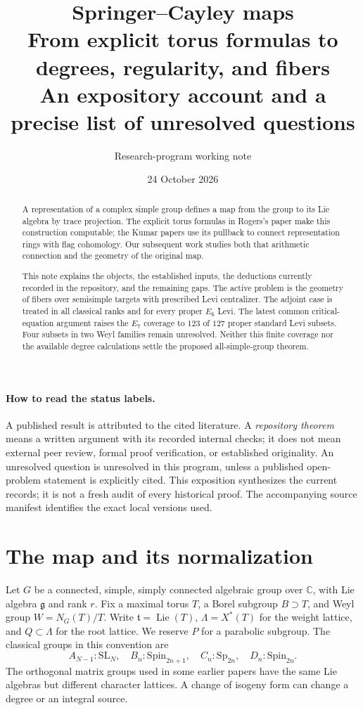 \documentclass[11pt]{article}
\title{\textbf{Springer--Cayley maps}\\[4pt]\large From explicit torus formulas to degrees, regularity, and fibers\\[4pt]\normalsize An expository account and a precise list of unresolved questions}
\author{Research-program working note}
\date{24 October 2026}
\newcommand{\C}{\mathbb C}
\newcommand{\g}{\mathfrak g}
\newcommand{\h}{\mathfrak t}
\newcommand{\Lie}{\operatorname{Lie}}
\begin{document}
\maketitle
\begin{abstract}
A representation of a complex simple group defines a map from the group to its Lie algebra by trace projection. The explicit torus formulas in Rogers's paper make this construction computable; the Kumar papers use its pullback to connect representation rings with flag cohomology. Our subsequent work studies both that arithmetic connection and the geometry of the original map.

This note explains the objects, the established inputs, the deductions currently recorded in the repository, and the remaining gaps. The active problem is the geometry of fibers over semisimple targets with prescribed Levi centralizer. The adjoint case is treated in all classical ranks and for every proper $E_6$ Levi. The latest common critical-equation argument raises the $E_7$ coverage to $123$ of $127$ proper standard Levi subsets. Four subsets in two Weyl families remain unresolved. Neither this finite coverage nor the available degree calculations settle the proposed all-simple-group theorem.
\end{abstract}

\paragraph{How to read the status labels.}
A published result is attributed to the cited literature. A \emph{repository theorem} means a written argument with its recorded internal checks; it does not mean external peer review, formal proof verification, or established originality. An unresolved question is unresolved in this program, unless a published open-problem statement is explicitly cited. This exposition synthesizes the current records; it is not a fresh audit of every historical proof. The accompanying source manifest identifies the exact local versions used.

\section{The map and its normalization}

Let $G$ be a connected, simple, simply connected algebraic group over $\C$, with Lie algebra $\g$ and rank $r$. Fix a maximal torus $T$, a Borel subgroup $B\supset T$, and Weyl group $W=N_G(T)/T$. Write $\h=\Lie(T)$, $\Lambda=X^*(T)$ for the weight lattice, and $Q\subset\Lambda$ for the root lattice. We reserve $P$ for a parabolic subgroup. The classical groups in this convention are
\[
 A_{N-1}:\mathrm{SL}_N,\quad B_n:\mathrm{Spin}_{2n+1},\quad
 C_n:\mathrm{Sp}_{2n},\quad D_n:\mathrm{Spin}_{2n}.
\]
The orthogonal matrix groups used in some earlier papers have the same Lie algebras but different character lattices. A change of isogeny form can change a degree or an integral source.
\end{document}
